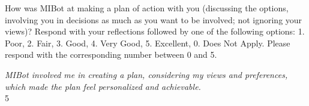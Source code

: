 \begin{researcherbox}
	How was MIBot at making a plan of action with you (discussing the options, involving you in decisions as much as you want to be involved; not ignoring your views)? Respond with your reflections followed by one of the following options: 1. Poor, 2. Fair, 3. Good, 4. Very Good, 5. Excellent, 0. Does Not Apply. Please respond with the corresponding number between 0 and 5.
\end{researcherbox}

\begin{clientbox}
	\textit{MIBot involved me in creating a plan, considering my views and preferences, which made the plan feel personalized and achievable.} \\
	5
\end{clientbox}

